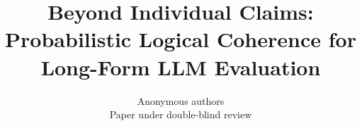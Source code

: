 

\title{Beyond Individual Claims: Probabilistic Logical Coherence
       for Long-Form LLM Evaluation}

\author{Anonymous authors\\Paper under double-blind review}

\renewcommand{\topfraction}{0.95}
\renewcommand{\bottomfraction}{0.85}
\renewcommand{\textfraction}{0.05}
\renewcommand{\floatpagefraction}{0.90}
\setcounter{topnumber}{3}
\setcounter{bottomnumber}{2}
\setcounter{totalnumber}{4}


\maketitle

